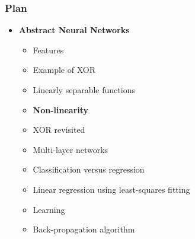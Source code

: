 %
\begin{frame}
\frametitle{Plan}

\begin{itemize}

  \item \textbf{Abstract Neural Networks}

  \begin{itemize}

    \item Features

    \item Example of XOR

    \item Linearly separable functions

    \item \textbf{Non-linearity}

    \item XOR revisited

    \item Multi-layer networks

    \item Classification versus regression

    \item Linear regression using least-squares fitting

    \item Learning

    \item Back-propagation algorithm

  \end{itemize}

\end{itemize}

\end{frame}

